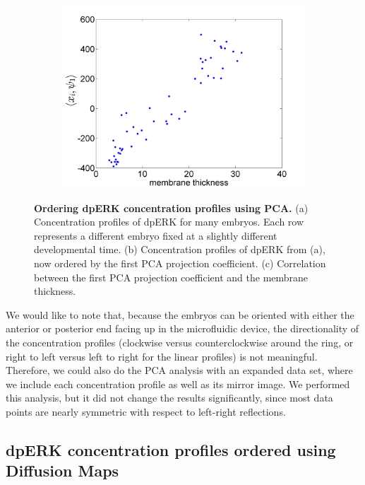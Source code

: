 \documentclass[10pt]{article}
\begin{document}
\begin{figure}[H]
\begin{subfigure}{0.3\textwidth}
\includegraphics[width=\textwidth]{PCA_time_corr}
\caption{}
\end{subfigure}
\caption{{\bf Ordering dpERK concentration profiles using PCA.} (a) Concentration profiles of dpERK for many embryos. Each row represents a different embryo fixed at a slightly different developmental time.
(b) Concentration profiles of dpERK from (a), now ordered by the first PCA projection coefficient.
(c) Correlation between the first PCA projection coefficient and the membrane thickness.}
\label{fig:PCA_ordering}
\end{figure}

We would like to note that, because the embryos can be oriented with either the anterior or posterior end facing up in the microfluidic device, the directionality of the concentration profiles (clockwise versus counterclockwise around the ring, or right to left versus left to right for the linear profiles) is not meaningful. 
%
Therefore, we could also do the PCA analysis with an expanded data set, where we include each concentration profile as well as its mirror image.
%
We performed this analysis, but it did not change the results significantly, since most data points are nearly symmetric with respect to left-right reflections.

\subsection*{dpERK concentration profiles ordered using Diffusion Maps}
\end{document}
